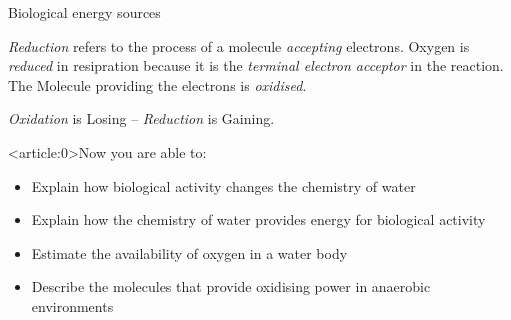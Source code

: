 \documentclass[a4paper,titlepage]{article}
\begin{document}
\begin{frame}{Biological energy sources}
{\medskip \emph{Reduction} refers to the process of a molecule \emph{accepting}
electrons. Oxygen is \emph{reduced} in resipration because it is the
\emph{terminal electron acceptor} in the reaction. The Molecule
providing the electrons is \emph{oxidised}.

\medskip \textit{Oxidation} is Losing -- \textit{Reduction} is Gaining.
}
\end{frame}

\begin{frame}<article:0>{Now you are able to:}
\begin{itemize}
\item Explain how biological activity changes the chemistry of water
\item Explain how the chemistry of water provides energy for biological activity
\item Estimate the availability of oxygen in a water body
\item Describe the molecules that provide oxidising power in anaerobic environments
\end{itemize}
\end{frame}
\end{document}
